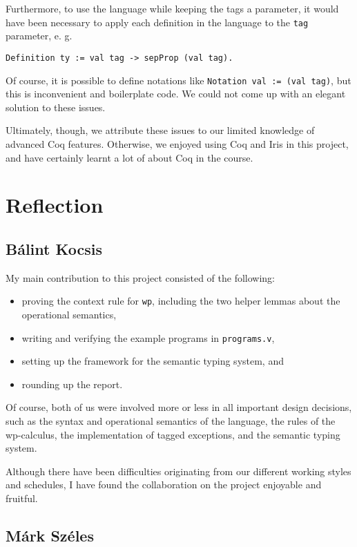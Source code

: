 \documentclass{article}
\begin{document}
Furthermore, to use the language while keeping the tags a parameter, it would have been necessary to apply each definition in the language
to the \texttt{tag} parameter, e. g.
\begin{lstlisting}
Definition ty := val tag -> sepProp (val tag).
\end{lstlisting}
Of course, it is possible to define notations like \texttt{Notation val := (val tag)}, but this is inconvenient and boilerplate code. We could not come up with
an elegant solution to these issues.

Ultimately, though, we attribute these issues to our limited knowledge of advanced Coq features. Otherwise, we enjoyed using Coq and Iris in this project, and
have certainly learnt a lot of about Coq in the course.

\section{Reflection}

\subsection{Bálint Kocsis}

My main contribution to this project consisted of the following:
\begin{itemize}
  \itemsep 0pt
  \item proving the context rule for \texttt{wp}, including the two helper lemmas about the operational semantics,
  \item writing and verifying the example programs in \texttt{programs.v},
  \item setting up the framework for the semantic typing system, and
  \item rounding up the report.
\end{itemize}

Of course, both of us were involved more or less in all important design decisions, such as the syntax and operational semantics of the language,
the rules of the wp-calculus, the implementation of tagged exceptions, and the semantic typing system.

Although there have been difficulties originating from our different working styles and schedules, I have found the collaboration on the project
enjoyable and fruitful.

\subsection{Márk Széles}
\end{document}
